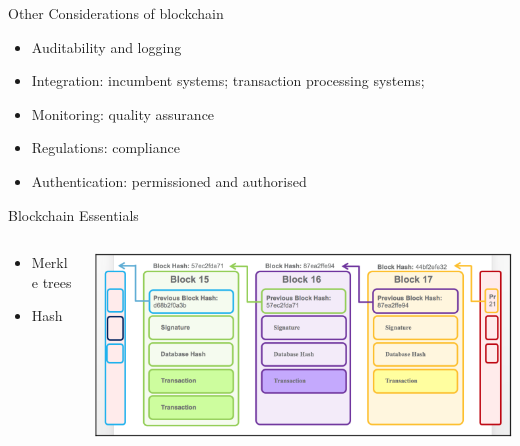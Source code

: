 \documentclass[pdf,table]{beamer}
\begin{document}
\begin{frame}{Other Considerations of blockchain}
	\begin{itemize}
		\item Auditability and logging
		\item Integration: incumbent systems; transaction processing systems; 
		\item Monitoring: quality assurance
		\item Regulations: compliance
		\item Authentication: permissioned and authorised
	\end{itemize}
\end{frame}


\begin{frame}{Blockchain Essentials}
	\begin{columns}[T]
		\begin{column}{0.48\textwidth}
			\begin{itemize}
				\item Merkle trees
				\item Hash
			\end{itemize}
		\end{column}
		\begin{column}{0.48\textwidth}
			\includegraphics[scale=0.45]{blocks}
		\end{column}
	\end{columns}	
\end{frame}
\end{document}
